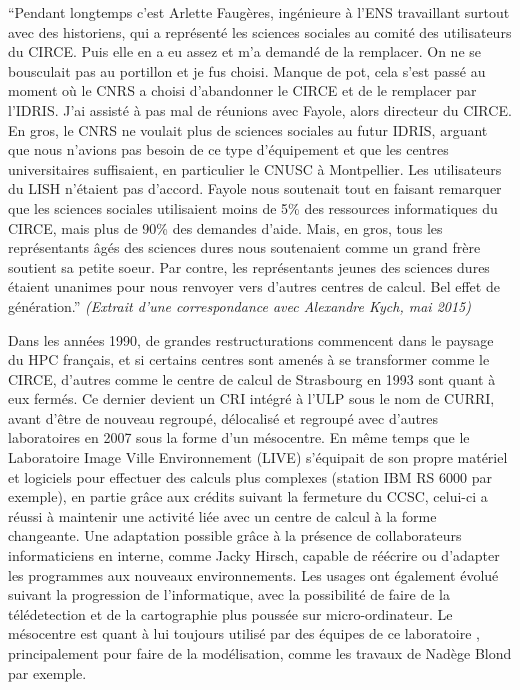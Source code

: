 \enquote{Pendant longtemps c'est Arlette Faugères, ingénieure à l'ENS travaillant surtout avec des historiens, qui a représenté les sciences sociales au comité des utilisateurs du CIRCE. Puis elle en a eu assez et m'a demandé de la remplacer. On ne se bousculait pas au portillon et je fus choisi. Manque de pot, cela s'est passé au moment où le CNRS a choisi d'abandonner le CIRCE et de le remplacer par l'IDRIS. J'ai assisté à pas mal de réunions avec Fayole, alors directeur du CIRCE. En gros, le CNRS ne voulait plus de sciences sociales au futur IDRIS, arguant que nous n'avions pas besoin de ce type d'équipement et que les centres universitaires suffisaient, en particulier le CNUSC à Montpellier. Les utilisateurs du LISH n'étaient pas d'accord. Fayole nous soutenait tout en faisant remarquer que les sciences sociales utilisaient moins de 5\% des ressources informatiques du CIRCE, mais plus de 90\% des demandes d'aide. Mais, en gros, tous les représentants âgés des sciences dures nous soutenaient comme un grand frère soutient sa petite soeur. Par contre, les représentants jeunes des sciences dures étaient unanimes pour nous renvoyer vers d'autres centres de calcul. Bel effet de génération.} \textit{(Extrait d'une correspondance avec Alexandre Kych, mai 2015)} 

Dans les années 1990, de grandes restructurations commencent dans le paysage du HPC français, et si certains centres sont amenés à se transformer comme le CIRCE, d'autres comme le centre de calcul de Strasbourg en 1993 sont quant à eux fermés. Ce dernier devient un CRI intégré à l'ULP sous le nom de CURRI, avant d'être de nouveau regroupé, délocalisé et regroupé avec d'autres laboratoires en 2007 sous la forme d'un mésocentre. En même temps que le Laboratoire Image Ville Environnement (LIVE) s'équipait de son propre matériel et logiciels pour effectuer des calculs plus complexes (station IBM RS 6000 par exemple), en partie grâce aux crédits suivant la fermeture du CCSC, celui-ci a réussi à maintenir une activité liée avec un centre de calcul à la forme changeante. Une adaptation possible grâce à la présence de collaborateurs informaticiens en interne, comme Jacky Hirsch, capable de réécrire ou d'adapter les programmes aux nouveaux environnements. Les usages ont également évolué suivant la progression de l'informatique, avec la possibilité de faire de la télédetection et de la cartographie plus poussée sur micro-ordinateur. Le mésocentre est quant à lui toujours utilisé par des équipes de ce laboratoire \autocite{Asch2012}, principalement pour faire de la modélisation, comme les travaux de Nadège Blond par exemple.

